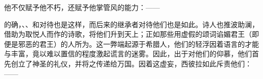 他不仅赋予他不朽，还赋予他掌管风的能力：——\par

\par

的确，、、和对待也是这样，而后来的继承者对待他们也是如此。诗人也推波助澜，借助为取悦人而作的诗歌，将他们升到天上；正如那些用虚假的颂词谄媚君王（即便是邪恶的君王）的人所为。这一弊端起源于希腊人，他们的轻浮因着语言的才能与丰富，竟以难以置信的程度激起谎言的迷雾。因此，出于对他们的仰慕，他们首先创立了神圣的礼仪，并将之传递给万国。因着这虚妄，西彼拉如此斥责他们：——\par

\par

